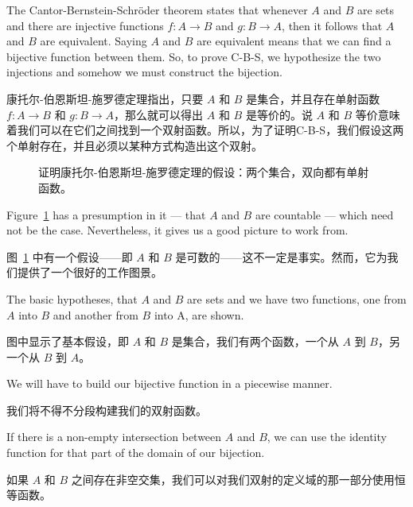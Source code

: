 The Cantor-Bernstein-Schr\"{o}der theorem states that
whenever $A$
and $B$ are sets and there are injective functions
$f : A \longrightarrow B$ and $g : B \longrightarrow A$,
then it follows that $A$ and $B$ are equivalent.  Saying $A$ and $B$
are equivalent
means that we can find a bijective function between them.  So, to prove
C-B-S, we hypothesize the two injections and somehow we must construct the
bijection.

康托尔-伯恩斯坦-施罗德定理指出，只要 $A$ 和 $B$ 是集合，并且存在单射函数 $f : A \longrightarrow B$ 和 $g : B \longrightarrow A$，那么就可以得出 $A$ 和 $B$ 是等价的。说 $A$ 和 $B$ 等价意味着我们可以在它们之间找到一个双射函数。所以，为了证明C-B-S，我们假设这两个单射存在，并且必须以某种方式构造出这个双射。

\begin{figure}[!hbtp]
    \begin{center}
        
    \end{center}
    \caption[Setup for proving the C-B-S theorem.]{Hypotheses for %
    proving the Cantor-Bernstein-Schr\"{o}der theorem: %
    two sets with injective functions going both ways.}
    \caption[证明C-B-S定理的设置。]{证明康托尔-伯恩斯坦-施罗德定理的假设：两个集合，双向都有单射函数。}
    \label{fig:CBS_setup}
\end{figure}

Figure~\ref{fig:CBS_setup} has a presumption in it ---
that $A$ and $B$ are countable --- which
need not
be the case.  Nevertheless, it gives us a good picture to work from.

图~\ref{fig:CBS_setup} 中有一个假设——即 $A$ 和 $B$ 是可数的——这不一定是事实。然而，它为我们提供了一个很好的工作图景。

The basic hypotheses, that $A$ and $B$ are sets and we have two functions, one
from $A$ into $B$ and another from $B$ into A, are shown.

图中显示了基本假设，即 $A$ 和 $B$ 是集合，我们有两个函数，一个从 $A$ 到 $B$，另一个从 $B$ 到 $A$。

We will have to build our bijective function in a piecewise manner.

我们将不得不分段构建我们的双射函数。

If there is a non-empty intersection between $A$ and $B$, we can use the
identity function for that part of the domain of our bijection.

如果 $A$ 和 $B$ 之间存在非空交集，我们可以对我们双射的定义域的那一部分使用恒等函数。

